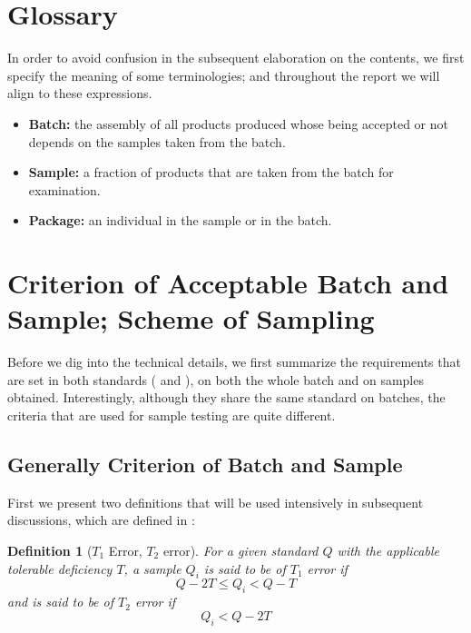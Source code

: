 \documentclass[12pt]{article}
\newtheorem{definition}{Definition}[section]
\begin{document}
\section{Glossary}

In order to avoid confusion in the subsequent elaboration on the contents, we first specify the meaning of some terminologies; and throughout the report we will align to these expressions.

\begin{itemize}
	\item \textbf{Batch:} the assembly of all products produced whose being accepted or not depends on the samples taken from the batch.
	\item \textbf{Sample:} a fraction of products that are taken from the batch for examination. 
	\item \textbf{Package:} an individual in the sample or in the batch.
\end{itemize}

\section{Criterion of Acceptable Batch and Sample; Scheme of Sampling}

Before we dig into the technical details, we first summarize the requirements that are set in both standards (\cite{JJF2005} and \cite{OIML2016}), on both the whole batch and on samples obtained. Interestingly, although they share the same standard on batches, the criteria that are used for sample testing are quite different.

\subsection{Generally Criterion of Batch and Sample}

First we present two definitions that will be used intensively in subsequent discussions, which are defined in \cite{OIML2016}:

\begin{definition}[$T_1$ Error, $T_2$ error]
    For a given standard $Q$ with the applicable tolerable deficiency $T$, a sample $Q_i$ is said to be of $T_1$ error if
    $$
    Q-2T \leq Q_i < Q-T
    $$
    and is said to be of $T_2$ error if
    $$
    Q_i < Q-2T
    $$
\end{definition}
\end{document}
